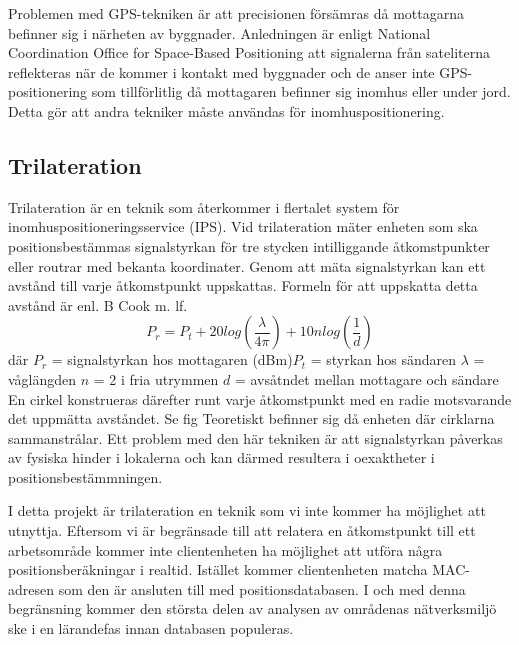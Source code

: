 \documentclass[a4paper,12pt]{article}
\begin{document}
Problemen med GPS-tekniken är att precisionen försämras då mottagarna befinner sig i närheten av byggnader. Anledningen är enligt National Coordination Office for Space-Based Positioning att signalerna från sateliterna reflekteras när de kommer i kontakt med byggnader och de anser inte GPS-positionering som tillförlitlig då mottagaren befinner sig inomhus eller under jord.\cite{GPS_US_ACCURACY} Detta gör att andra tekniker måste användas för inomhuspositionering.

\subsection{Trilateration}
Trilateration är en teknik som återkommer i flertalet system för inomhuspositioneringsservice (IPS). Vid trilateration mäter enheten som ska positionsbestämmas signalstyrkan för tre stycken intilliggande åtkomstpunkter eller routrar med bekanta koordinater. Genom att mäta signalstyrkan kan ett avstånd till varje åtkomstpunkt uppskattas. Formeln för att uppskatta detta avstånd är enl. B Cook m. lf.\cite{cook2005indoor}
\newline
$$ P_r = P_t + 20log(\frac{\lambda}{4\pi}) + 10nlog(\frac{1}{d})$$
där
$  P_r $ = signalstyrkan hos mottagaren (dBm)\newline $P_t$ = styrkan hos sändaren\newline
$\lambda$ = våglängden\newline
$ n $ = 2 i fria utrymmen\newline
$ d $ = avsåtndet mellan mottagare och sändare
\bigskip
\newline
En cirkel konstrueras därefter runt varje åtkomstpunkt med en radie motsvarande det uppmätta avståndet. Se fig %
Teoretiskt befinner sig då enheten där cirklarna sammanstrålar. Ett problem med den här tekniken är att signalstyrkan påverkas av fysiska hinder i lokalerna och kan därmed resultera i oexaktheter i positionsbestämmningen.

I detta projekt är trilateration en teknik som vi inte kommer ha möjlighet att utnyttja. Eftersom vi är begränsade till att relatera en åtkomstpunkt till ett arbetsområde kommer inte clientenheten ha möjlighet att utföra några positionsberäkningar i realtid. Istället kommer clientenheten matcha MAC-adresen som den är ansluten till med positionsdatabasen. I och med denna begränsning kommer den största delen av analysen av områdenas nätverksmiljö ske i en lärandefas innan databasen populeras.
\end{document}
